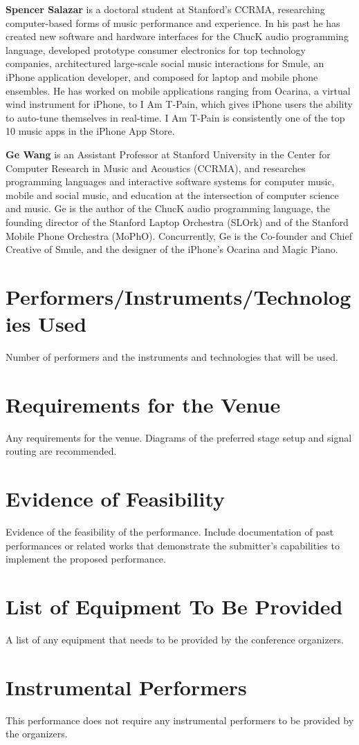 \documentclass{nime-document-singlecolumn-class}
\begin{document}
{\bf Spencer Salazar} is a doctoral student at Stanford's CCRMA, researching computer-based forms of music performance and experience.
In his past he has created new software and hardware interfaces for the ChucK audio programming language, developed prototype consumer electronics for top technology companies, architectured large-scale social music interactions for Smule, an iPhone application developer, and composed for laptop and mobile phone ensembles.
He has worked on mobile applications ranging from Ocarina, a virtual wind instrument for iPhone, to I Am T-Pain, which gives iPhone users the ability to auto-tune themselves in real-time.
I Am T-Pain is consistently one of the top 10 music apps in the iPhone App Store.

{\bf Ge Wang} is an Assistant Professor at Stanford University in the Center for Computer Research in Music and Acoustics (CCRMA), and researches programming languages and interactive software systems for computer music, mobile and social music, and education at the intersection of computer science and music. Ge is the author of the ChucK audio programming language, the founding director of the Stanford Laptop Orchestra (SLOrk) and of the Stanford Mobile Phone Orchestra (MoPhO). Concurrently, Ge is the Co-founder and Chief Creative of Smule, and the designer of the iPhone's Ocarina and Magic Piano. 

\section{Performers/Instruments/Technologies Used}
Number of performers and the instruments and technologies that will be used.

\section{Requirements for the Venue}
Any requirements for the venue. Diagrams of the preferred stage setup and signal routing are recommended.

\section{Evidence of Feasibility}
Evidence of the feasibility of the performance. Include documentation of past performances or related works that demonstrate the submitter's capabilities to implement the proposed performance.

\section{List of Equipment To Be Provided}
A list of any equipment that needs to be provided by the conference organizers.

\section{Instrumental Performers}
This performance does not require any instrumental performers to be provided by the organizers.

\end{document}
